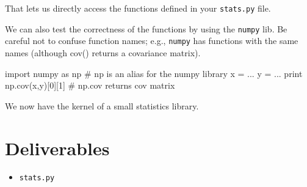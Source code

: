 \begin{fullwidth}
\noindent That lets us directly access the functions defined in your {\tt stats.py} file.
 
We can also test the correctness of the functions by using the {\tt numpy} lib. Be careful not to confuse function names; e.g., {\tt numpy} has functions with the same names (although cov() returns a covariance matrix).

\begin{pyverbatim}
import numpy as np  # np is an alias for the numpy library
x = ...
y = ...
print np.cov(x,y)[0][1] # np.cov returns cov matrix
\end{pyverbatim}

We now have the kernel of a small statistics library.

\section{Deliverables}

\begin{itemize}
\item {\tt stats.py}
\end{itemize}

\end{fullwidth}

